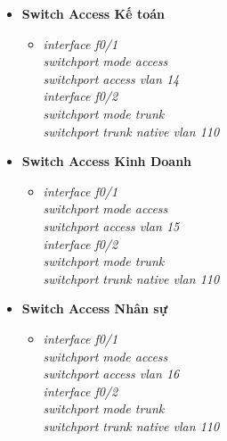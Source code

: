 \documentclass[a4paper, 12pt]{article}
\begin{document}
\begin{itemize}
\begin{itemize}
\begin{itemize}
    \end{itemize}
     \item \textbf{Switch Access  Kế toán}
     \begin{itemize}
      \item \textit{interface f0/1\\
                    switchport mode access\\
                    switchport access vlan 14\\
                    interface f0/2\\
                    switchport mode trunk\\
                    switchport trunk native vlan 110\\}
     
    \end{itemize}
     \item \textbf{Switch Access  Kinh Doanh}
     \begin{itemize}
      \item \textit{interface f0/1\\
                    switchport mode access\\
                    switchport access vlan 15\\
                    interface f0/2\\
                    switchport mode trunk\\
                    switchport trunk native vlan 110\\}
     
    \end{itemize}
     \item \textbf{Switch Access  Nhân sự}
     \begin{itemize}
      \item \textit{interface f0/1\\
                    switchport mode access\\
                    switchport access vlan 16\\
                    interface f0/2\\
                    switchport mode trunk\\
                    switchport trunk native vlan 110\\}
     

\end{itemize}
\end{itemize}
\end{itemize}
\end{document}
